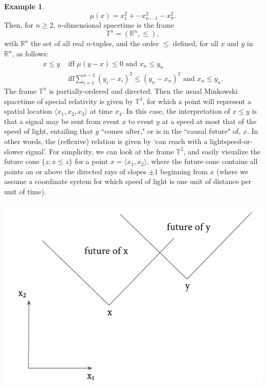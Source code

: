 \documentclass[11pt]{book}
\theoremstyle{definition}
\newtheorem{example}{Example}[section]
\theoremstyle{definition}
\theoremstyle{definition}
\theoremstyle{theorem}
\theoremstyle{definition}
\begin{document}
\begin{example}
	\begin{equation*}
	\mu(x) = x_1^2 + \cdots x_{n-1}^2 - x_n^2.
	\end{equation*}
	Then, for $n \geq 2$, $n$-dimensional spacetime is the frame 
	\begin{equation*}
	\mathbb{T}^n = (\mathbb{R}^n, \leq),
	\end{equation*} 
	with $\mathbb{R}^n$ the set of all real $n$-tuples, and the order $\leq$ defined, for all $x$ and $y$ in $\mathbb{R}^n$, as follows: 
	\begin{equation*}
	\begin{split} 
	x \leq y & \text{ iff } \mu(y-x) \leq 0 \text{ and } x_n \leq y_n \\
	& \text{ iff} \sum_{i=1}^{n-1} (y_i - x_i)^2 \leq (y_n - x_n)^2 \text{ and } x_n \leq y_n. 
	\end{split}  
	\end{equation*}
	The frame $\mathbb{T}^n$ is partially-ordered and directed. 
	Then the usual Minkowski spacetime of special relativity is given by $\mathbb{T}^4$, for which a point will represent a spatial location $\langle x_1, x_2, x_3 \rangle$ at time $x_4$. In this case, the interpretation of $x \leq y$ is that a signal may be sent from event $x$ to event $y$ at a speed at most that of the speed of light, entailing that $y$ ``comes after," or is in the ``causal future" of, $x$. In other words, the (reflexive) relation is given by `can reach with a lightspeed-or-slower signal'. For simplicity, we can look at the frame $\mathbb{T}^2$, and easily visualize the future cone $\{z: x \leq z \}$ for a point $x = \langle x_1, x_2 \rangle$, where the future cone contains all points on or above the directed rays of slopes $\pm 1$ beginning from $x$ (where we assume a coordinate system for which speed of light is one unit of distance per unit of time). 
	\begin{center}
		\includegraphics*[scale =0.4]{FutureLightCone.png}

\end{center}
\end{example}
\end{document}
